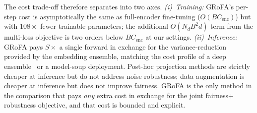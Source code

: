 \begin{table}[htbp]
\centering
\caption{Cost comparison vs.\ representative baselines. $N$: training-set size; $B$: batch size; $S$: ensemble seeds; $C_{\text{enc}}$: frozen backbone forward; $\Theta_{\text{enc}}$: encoder parameter count.}
\label{tab:cost_compare}
\end{table}

The cost trade-off therefore separates into two axes.
\emph{(i)~Training:} GRoFA's per-step cost is asymptotically the same as full-encoder fine-tuning ($O(BC_{\text{enc}})$) but with $108{\times}$ fewer trainable parameters; the additional $O(N_d B^2 d)$ term from the multi-loss objective is two orders below $BC_{\text{enc}}$ at our settings.
\emph{(ii)~Inference:} GRoFA pays $S{\times}$ a single forward in exchange for the variance-reduction provided by the embedding ensemble, matching the cost profile of a deep ensemble~\cite{lakshminarayanan2017simple} or a model-soup deployment.
Post-hoc projection methods are strictly cheaper at inference but do not address noise robustness; data augmentation is cheaper at inference but does not improve fairness.
GRoFA is the only method in the comparison that pays \emph{any} extra cost in exchange for the joint fairness$+$robustness objective, and that cost is bounded and explicit.



